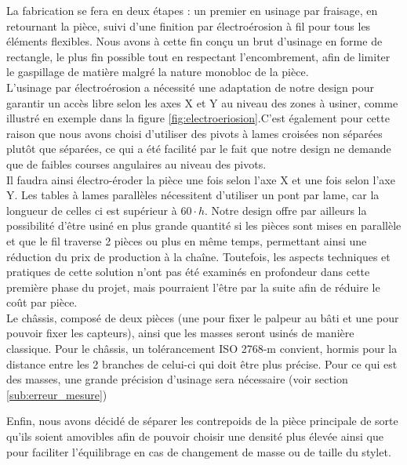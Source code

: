 \documentclass[a4paper, 11pt]{article} %
\begin{document}
La fabrication se fera en deux étapes : un premier en usinage par fraisage, en retournant la pièce, suivi d’une finition par électroérosion à fil pour tous les éléments flexibles.
Nous avons à cette fin conçu un brut d’usinage en forme de rectangle, le plus fin possible tout en respectant l’encombrement, afin de limiter le gaspillage de matière malgré la nature monobloc de la pièce. \\

L'usinage par électroérosion a nécessité une adaptation de notre design pour garantir un accès libre selon les axes X et Y au niveau des zones à usiner, comme illustré en exemple dans la figure \ref{fig:electroeriosion}.C'est également pour cette raison que nous avons choisi d'utiliser des pivots à lames croisées non séparées plutôt que séparées, ce qui a été facilité par le fait que notre design ne demande que de faibles courses angulaires au niveau des pivots.\\ 

Il faudra ainsi électro-éroder la pièce une fois selon l'axe X et une fois selon l'axe Y. Les tables à lames parallèles nécessitent d'utiliser un pont par lame, car la longueur de celles ci est supérieur à $60 \cdot h$.
Notre design offre par ailleurs la possibilité d'être usiné en plus grande quantité si les pièces sont mises en parallèle et que le fil traverse 2 pièces ou plus en même temps, permettant ainsi une réduction du prix de production à la chaîne. Toutefois, les aspects techniques et pratiques de cette solution n’ont pas été examinés en profondeur dans cette première phase du projet, mais pourraient l'être par la suite afin de réduire le coût par pièce.\\

Le châssis, composé de deux pièces (une pour fixer le palpeur au bâti et une pour pouvoir fixer les capteurs), ainsi que les masses seront usinés de manière classique. Pour le châssis, un tolérancement ISO 2768-m convient, hormis pour la distance entre les 2 branches de celui-ci qui doit être plus précise. Pour ce qui est des masses, une grande précision d'usinage sera nécessaire (voir section \ref{sub:erreur_mesure})

Enfin, nous avons décidé de séparer les contrepoids de la pièce principale de sorte qu'ils soient  amovibles afin de pouvoir choisir une densité plus élevée ainsi que pour faciliter l'équilibrage en cas de changement de masse ou de taille du stylet.
\end{document}
